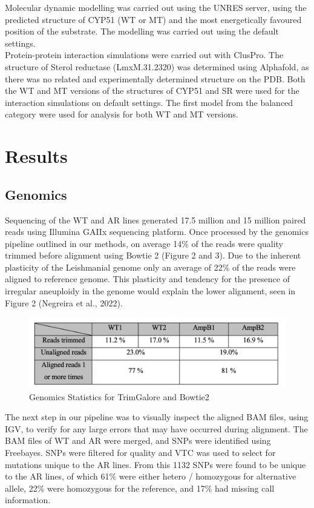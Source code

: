 \documentclass{bioinfo}
\begin{document}
Molecular dynamic modelling was carried out using the UNRES server,
using the predicted structure of CYP51 (WT or MT) and the most
energetically favoured position of the substrate. The modelling was
carried out using the default settings.\\

Protein-protein interaction simulations were carried out with ClusPro.
The structure of Sterol reductase (LmxM.31.2320) was determined using
Alphafold, as there was no related and experimentally determined
structure on the PDB. Both the WT and MT versions of the structures of
CYP51 and SR were used for the interaction simulations on default
settings. The first model from the balanced category were used for
analysis for both WT and MT versions.

\section{Results}

\subsection{Genomics}

Sequencing of the WT and AR lines generated 17.5 million and 15 million
paired reads using Illumina GAIIx sequencing platform. Once processed by
the genomics pipeline outlined in our methods, on average 14\% of the
reads were quality trimmed before alignment using Bowtie 2 (Figure 2 and
3). Due to the inherent plasticity of the Leishmanial genome only an
average of 22\% of the reads were aligned to reference genome. This
plasticity and tendency for the presence of irregular aneuploidy in the
genome would explain the lower alignment, seen in Figure 2 (Negreira et
al., 2022).\\

\begin{figure}
\includegraphics[width=1\linewidth]{Table 2} \caption{Genomics Statistics for TrimGalore and Bowtie2}\label{fig:table2}
\end{figure}

The next step in our pipeline was to visually inspect the aligned BAM
files, using IGV, to verify for any large errors that may have occurred
during alignment. The BAM files of WT and AR were merged, and SNPs were
identified using Freebayes. SNPs were filtered for quality and VTC was
used to select for mutations unique to the AR lines. From this 1132 SNPs
were found to be unique to the AR lines, of which 61\% were either
hetero / homozygous for alternative allele, 22\% were homozygous for the
reference, and 17\% had missing call information.\\
\end{document}
